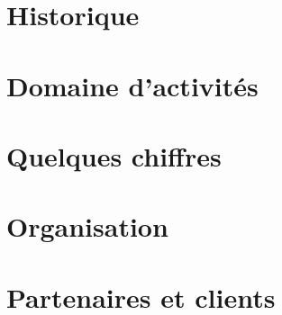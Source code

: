 \section{Historique}
	

\section{Domaine d'activités}
	

\section{Quelques chiffres}
	
	
\section{Organisation}
	
		
\section{Partenaires et clients}
	